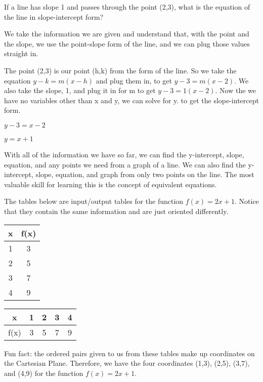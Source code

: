\begin{example}
If a line has slope 1 and passes through the point (2,3), what is the equation of the line in slope-intercept form?

We take the information we are given and understand that, with the point and the slope, we use the point-slope form of the line, and we can plug those values straight in.

The point (2,3) is our point (h,k) from the form of the line.  So we take the equation $y - k = m(x - h)$ and plug them in, to get $y - 3 = m(x - 2)$.  We also take the slope, 1, and plug it in for m to get $y - 3 = 1(x - 2)$.  Now the we have no variables other than x and y, we can solve for y. to get the slope-intercept form.

$y - 3 = x - 2$

$y = x + 1$

\end{example}

With all of the information we have so far, we can find the y-intercept, slope, equation, and any points we need from a graph of a line.  We can also find the y-intercept, slope, equation, and graph from only two points on the line.  The most valuable skill for learning this is the concept of equivalent equations.












 
\begin{example}
The tables below are input/output tables for the function $f(x)=2x+1$. Notice that they contain the same information and are just oriented differently.
\begin{center}
\begin{tabular}{|c|c|}
\hline
	x & f(x) \\
	\hline
	1 & 3 \\ 
	\hline
	2 & 5 \\
	\hline
	3 & 7 \\ 
	\hline
	4 & 9 \\
	\hline 
\end{tabular}	\hspace{3cm} \begin{tabular}{|c|c|c|c|c|}
\hline
	x & 1&2 & 3 & 4 \\
	\hline
	f(x) & 3 & 5 & 7 & 9 \\
	\hline
\end{tabular}
\end{center}

Fun fact: the ordered pairs given to us from these tables make up coordinates on the Cartesian Plane. Therefore, we have the four coordinates (1,3), (2,5), (3,7), and (4,9) for the function $f(x)=2x+1$. 
\end{example}


